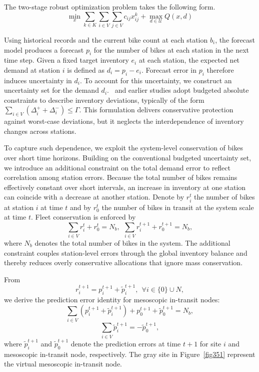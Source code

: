\documentclass[preprint,12pt,authoryear]{elsarticle}
\begin{document}
The two-stage robust optimization problem takes the following form.
\begin{equation}\label{ques3}
    \min_x \sum_{k\in K}\sum_{i\in V}\sum_{j\in V}c_{ij}x_{ij}^k + \max_{d\in \mathcal{U}} Q(x,d)
\end{equation}

Using historical records and the current bike count at each station $b_i$, the forecast model produces a forecast $p_i$ for the number of bikes at each station in the next time step. Given a fixed target inventory $e_i$ at each station, the expected net demand at station $i$ is defined as $d_i=p_i-e_i$. Forecast error in $p_i$ therefore induces uncertainty in $d_i$. To account for this uncertainty, we construct an uncertainty set for the demand $d_i$.~\cite{zhao2025research} and earlier studies adopt budgeted absolute constraints to describe inventory deviations, typically of the form $\sum_{i\in V}(\Delta_i^+ + \Delta_i^-)\le \Gamma$. This formulation delivers conservative protection against worst-case deviations, but it neglects the interdependence of inventory changes across stations.

To capture such dependence, we exploit the system-level conservation of bikes over short time horizons. Building on the conventional budgeted uncertainty set, we introduce an additional constraint on the total demand error to reflect correlation among station errors. Because the total number of bikes remains effectively constant over short intervals, an increase in inventory at one station can coincide with a decrease at another station. Denote by $r_i^t$ the number of bikes at station $i$ at time $t$ and by $r_0^t$ the number of bikes in transit at the system scale at time $t$. Fleet conservation is enforced by
\begin{equation}\label{ques4}
    \sum_{i\in V} r_i^t + r_0^t=N_b, ~~
    \sum_{i\in V} r_i^{t+1} + r_0^{t+1}=N_b,
\end{equation}
where $N_b$ denotes the total number of bikes in the system. The additional constraint couples station-level errors through the global inventory balance and thereby reduces overly conservative allocations that ignore mass conservation.

From
\begin{equation}
   r_i^{t+1} = p_i^{t+1} + \tilde{p}_i^{t+1}, ~~\forall i\in \{0\}\cup N,
\end{equation}  we derive the prediction error identity for mesoscopic in-transit nodes:
\begin{equation}
   \sum_{i\in V} (p_i^{t+1} + \tilde{p}_i^{t+1}) + p_0^{t+1} + \tilde{p}_0^{t+1} = N_b,
\end{equation} 
\begin{equation}
    \sum_{i\in V} \tilde{p}_i^{t+1} =- \tilde{p}_0^{t+1},
\end{equation}  
where $\tilde{p}_i^{t+1}$ and $\tilde{p}_0^{t+1}$ denote the prediction errors at time $t+1$ for site $i$ and mesoscopic in-transit node, respectively. The gray site in Figure~\ref{fig351} represent the virtual mesoscopic in-transit node.
\end{document}
